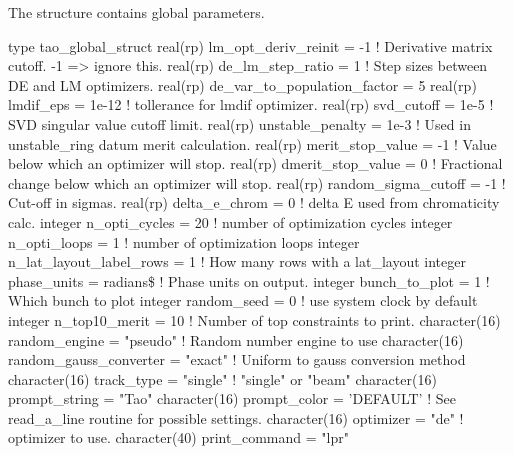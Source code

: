 {{{{{{{{The  structure contains \tao global parameters.
\begin{example}
type tao_global_struct
  real(rp) lm_opt_deriv_reinit = -1   ! Derivative matrix cutoff. -1 => ignore this.
  real(rp) de_lm_step_ratio = 1       ! Step sizes between DE and LM optimizers.
  real(rp) de_var_to_population_factor = 5 
  real(rp) lmdif_eps = 1e-12          ! tollerance for lmdif optimizer.
  real(rp) svd_cutoff = 1e-5          ! SVD singular value cutoff limit.
  real(rp) unstable_penalty = 1e-3    ! Used in unstable_ring datum merit calculation.
  real(rp) merit_stop_value = -1      ! Value below which an optimizer will stop.
  real(rp) dmerit_stop_value = 0      ! Fractional change below which an optimizer will stop.
  real(rp) random_sigma_cutoff = -1   ! Cut-off in sigmas.
  real(rp) delta_e_chrom = 0          ! delta E used from chromaticity calc.
  integer n_opti_cycles = 20          ! number of optimization cycles
  integer n_opti_loops = 1            ! number of optimization loops
  integer n_lat_layout_label_rows = 1 ! How many rows with a lat_layout
  integer phase_units = radians\$      ! Phase units on output.
  integer bunch_to_plot = 1           ! Which bunch to plot
  integer random_seed = 0             ! use system clock by default
  integer n_top10_merit = 10          ! Number of top constraints to print.
  character(16)  random_engine = "pseudo"         ! Random number engine to use
  character(16)  random_gauss_converter = "exact" ! Uniform to gauss conversion method
  character(16)  track_type = "single"            ! "single" or "beam" 
  character(16)  prompt_string = "Tao"
  character(16)  prompt_color = 'DEFAULT'         ! See read_a_line routine for possible settings.
  character(16)  optimizer     = "de"             ! optimizer to use.
  character(40)  print_command = "lpr"

\end{example}}}}}}}}}

